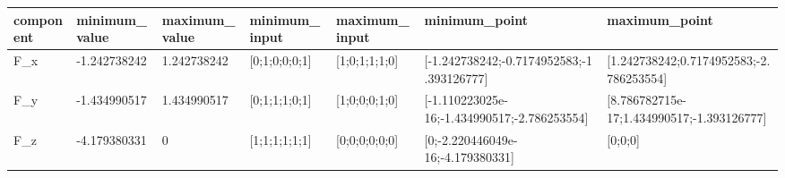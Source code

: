 \begin{tabular}{@{}lllllll@{}}
\toprule
component & minimum\_value & maximum\_value & minimum\_input & maximum\_input & minimum\_point & maximum\_point \\
\midrule
F\_x & -1.242738242 & 1.242738242 & [0;1;0;0;0;1] & [1;0;1;1;1;0] & [-1.242738242;-0.7174952583;-1.393126777] & [1.242738242;0.7174952583;-2.786253554] \\
F\_y & -1.434990517 & 1.434990517 & [0;1;1;1;0;1] & [1;0;0;0;1;0] & [-1.110223025e-16;-1.434990517;-2.786253554] & [8.786782715e-17;1.434990517;-1.393126777] \\
F\_z & -4.179380331 & 0 & [1;1;1;1;1;1] & [0;0;0;0;0;0] & [0;-2.220446049e-16;-4.179380331] & [0;0;0] \\
\bottomrule
\end{tabular}
